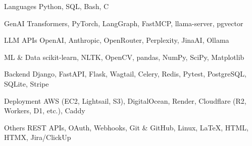 

\begin{cvskills}

\cvskill
    {Languages} %
    {Python, SQL, Bash, C} %

\cvskill
    {GenAI} %
    {Transformers, PyTorch, LangGraph, FastMCP, llama-server, pgvector} %

\cvskill
    {LLM APIs} %
    {OpenAI, Anthropic, OpenRouter, Perplexity, JinaAI, Ollama} %

\cvskill
    {ML \& Data} %
    {scikit-learn, NLTK, OpenCV, pandas, NumPy, SciPy, Matplotlib} %

\cvskill
    {Backend} %
    {Django, FastAPI, Flask, Wagtail, Celery, Redis, Pytest, PostgreSQL, SQLite, Stripe} %

\cvskill
    {Deployment} %
    {AWS (EC2, Lightsail, S3), DigitalOcean, Render, Cloudflare (R2, Workers, D1, etc.), Caddy} %

\cvskill
    {Others} %
    {REST APIs, OAuth, Webhooks, Git \& GitHub, Linux, LaTeX, HTML, HTMX, Jira/ClickUp} %

\end{cvskills}
